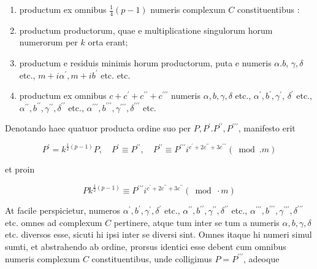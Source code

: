 \documentclass[10pt]{article}
\begin{document}
\begin{enumerate}
  \item productum ex omnibus \(\frac{1}{4}(p-1)\) numeris complexum \(C\) constituentibus :

  \item productum productorum, quae e multiplicatione singulorum horum numerorum per \(k\) orta erant;

  \item productum e residuis minimis horum productorum, puta e numeris \(\alpha . b\), \(\gamma, \delta\) etc., \(m+i \alpha^{\prime}, m+i b^{\prime}\) etc. etc.

  \item productum ex omnibus \(c+c^{\prime}+c^{\prime \prime}+c^{\prime \prime \prime}\) numeris \(\alpha, b, \gamma, \delta\) etc., \(\alpha^{\prime}, b^{\prime}, \gamma^{\prime}\), \(\delta^{\prime}\) etc., \(\alpha^{\prime \prime}, b^{\prime \prime}, \gamma^{\prime \prime}, \delta^{\prime \prime}\) etc., \(\alpha^{\prime \prime \prime}, b^{\prime \prime \prime}, \gamma^{\prime \prime \prime}, \delta^{\prime \prime \prime}\) etc.

\end{enumerate}

Denotando haec quatuor producta ordine suo per \(P, P^{\prime} . P^{\prime \prime}, P^{\prime \prime \prime}\), manifesto erit

\[
P^{\prime}=k^{\frac{1}{2}(p-1)} P, \quad P^{\prime} \equiv P^{\prime \prime}, \quad P^{\prime \prime} \equiv P^{\prime \prime \prime} i^{c^{\prime}+2 c^{\prime \prime}+3 c^{\prime \prime \prime}}(\bmod . m)
\]

et proin

\[
P k^{\frac{1}{2}(p-1)} \equiv P^{\prime \prime \prime} i^{c^{\prime}+2 c^{\prime \prime}+3 c^{\prime \prime}}(\bmod \cdot m)
\]

At facile perspicietur, numeros \(\alpha^{\prime}, b^{\prime}, \gamma^{\prime}, \delta^{\prime}\) etc., \(\alpha^{\prime \prime}, b^{\prime \prime}, \gamma^{\prime \prime}, \delta^{\prime \prime}\) etc., \(\alpha^{\prime \prime \prime}, b^{\prime \prime \prime}, \gamma^{\prime \prime \prime}, \delta^{\prime \prime \prime}\) etc. omnes ad complexum \(C\) pertinere, atque tum inter se tum a numeris \(\alpha, b, \gamma, \delta\) etc. diversos esse, sicuti hi ipsi inter se diversi sint. Omnes itaque hi numeri simul sumti, et abstrahendo ab ordine, prorsus identici esse debent cum omnibus numeris complexum \(C\) constituentibus, unde colligimus \(P=P^{\prime \prime \prime}\), adeoque
\end{document}
